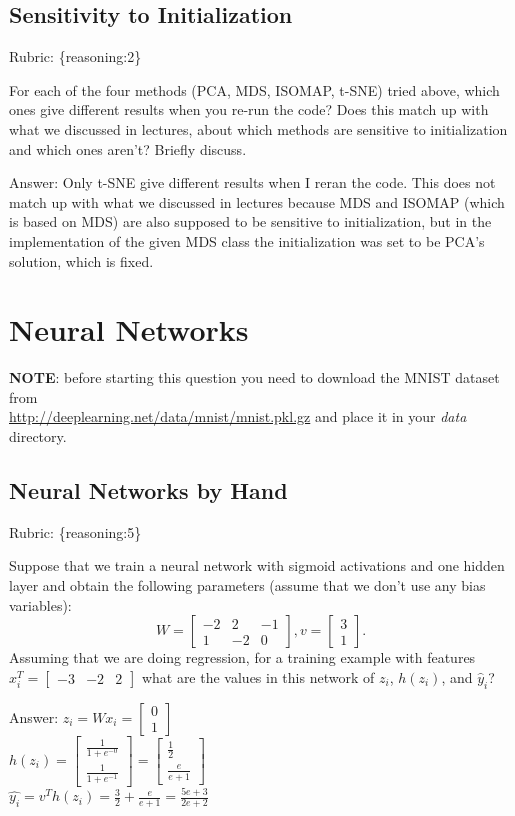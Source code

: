 \documentclass{article}
\def\rubric#1{\gre{Rubric: \{#1\}}}{}
\def\blu#1{{\color{blu}#1}}
\def\gre#1{{\color{gre}#1}}
\def\ans#1{\gre{Answer: #1}}{}
\newcommand{\mat}[1]{\begin{bmatrix}#1\end{bmatrix}}
\begin{document}
\subsection{Sensitivity to Initialization}
\rubric{reasoning:2}

For each of the four methods (PCA, MDS, ISOMAP, t-SNE) tried above, which ones give different results when you re-run the code? Does this match up with what we discussed in lectures, about which methods are sensitive to initialization and which ones aren't? Briefly discuss.

\ans{Only t-SNE give different results when I reran the code. This does not match up with what we discussed in lectures because MDS and ISOMAP (which is based on MDS) are also supposed to be sensitive to initialization, but in the implementation of the given MDS class the initialization was set to be PCA's solution, which is fixed.}


\section{Neural Networks}

\textbf{NOTE}: before starting this question you need to download the MNIST dataset from \\ \url{http://deeplearning.net/data/mnist/mnist.pkl.gz} and place it in your \emph{data} directory.


\subsection{Neural Networks by Hand}
\rubric{reasoning:5}

Suppose that we train a neural network with sigmoid activations and one hidden layer and obtain the following parameters (assume that we don't use any bias variables):
\[
W = \mat{-2 & 2 & -1\\1 & -2 & 0}, v = \mat{3 \\1}.
\]
Assuming that we are doing regression, \blu{for a training example with features $x_i^T = \mat{-3 &-2 & 2}$ what are the values in this network of $z_i$, $h(z_i)$, and $\hat{y}_i$?}

\ans{$z_i = W x_i = \mat{0 \\ 1}$ \\ $h(z_i) = \mat{ \frac{1}{1 + e^{-0}} \\ \frac{1}{1 + e^{-1}}} = \mat{\frac{1}{2} \\ \frac{e}{e + 1}}$ \\ $\hat{y_i} =  v^T h(z_i) = \frac{3}{2} + \frac{e}{e + 1} = \frac{5 e + 3}{2 e + 2}$}
\end{document}
